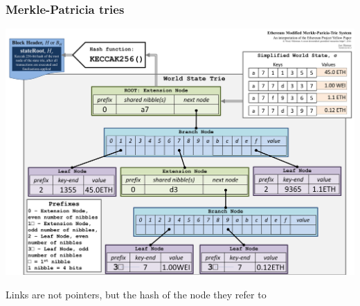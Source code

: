 \documentclass[11pt]{beamer}  %
\begin{document}
\begin{frame}\frametitle{Merkle-Patricia tries}

  \begin{center}
    \includegraphics[scale=0.11,clip=false]{pictures/merkle-patricia.png}
  \end{center}

  \begin{center}
    Links are not pointers, but the hash of the node they refer to
  \end{center}

\end{frame}
\end{document}
